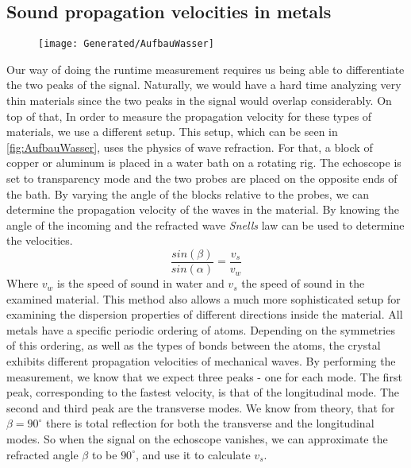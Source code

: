 \documentclass[a4paper,10pt,twocolumn]{article}
\begin{document}
    \subsection{Sound propagation velocities in metals}\label{propagationInMetals}
    \begin{figure}
        \begin{center}
        \texttt{[image: Generated/AufbauWasser]}
            \caption[]{}
            \label{fig:AufbauWasser}
        \end{center}
    \end{figure}    
    Our way of doing the runtime measurement requires us being able to differentiate the two peaks of the signal.
    Naturally, we would have a hard time analyzing very thin materials since the two peaks in the signal would overlap considerably.
    On top of that, 
    In order to measure the propagation velocity for these types of materials, we use a different setup.
    This setup, which can be seen in \autoref{fig:AufbauWasser}, uses the physics of wave refraction.
    For that, a block of copper or aluminum is placed in a water bath on a rotating rig.
    The echoscope is set to transparency mode and the two probes are placed on the opposite ends of the bath.
    By varying the angle of the blocks relative to the probes, we can determine the propagation velocity of the waves in the material.
    By knowing the angle of the incoming and the refracted wave \textit{Snells} law can be used to determine the velocities.
    \begin{equation}\label{eg:SnellLaw}
        \frac{sin(\beta)}{sin(\alpha)} = \frac{v_s}{v_w}
    \end{equation}
    Where $v_w$ is the speed of sound in water and $v_s$ the speed of sound in the examined material.
    This method also allows a much more sophisticated setup for examining the dispersion properties of different directions inside the material.
    All metals have a specific periodic ordering of atoms.
    Depending on the symmetries of this ordering, as well as the types of bonds between the atoms, the crystal exhibits different propagation velocities of mechanical waves.
    By performing the measurement, we know that we expect three peaks - one for each mode.
    The first peak, corresponding to the fastest velocity, is that of the longitudinal mode.
    The second and third peak are the transverse modes.
    We know from theory, that for $\beta = 90^\circ$ there is total reflection for both the transverse and the longitudinal modes.
    So when the signal on the echoscope vanishes, we can approximate the refracted angle $\beta$ to be $90^\circ $, and use it to calculate $v_s$.
\end{document}
